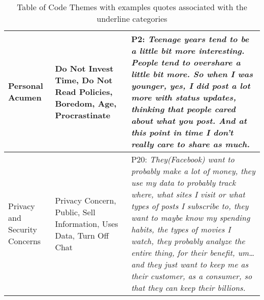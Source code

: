 \begin{table*}[htb!]
\begin{tabular}{ |p{3cm}||p{4cm}|p{10cm}| }
 \hline
 Personal Acumen    & Do Not Invest Time, Do Not Read Policies, Boredom, Age, Procrastinate& P2: \textit{Teenage years tend to be a little bit more interesting. People tend to overshare a little bit more. So when I was younger, yes, I did post a lot more with status updates, thinking that people cared about what you post. And at this point in time I don't really care to share as much. }\\
 \hline
 Privacy and Security Concerns  & Privacy Concern, Public, Sell Information, Uses Data, Turn Off Chat& P20: \textit{They(Facebook) want to probably make a lot of money, they use my data to probably track where, what sites I visit or what types of posts I subscribe to, they want to maybe know my spending habits, the types of movies I watch, they probably analyze the entire thing, for their benefit, um… and they just want to keep me as their customer, as a consumer, so that they can keep their billions.}\\ 
  \hline
 \hline
\end{tabular} 
\caption{Table of Code Themes with examples quotes associated with the underline categories}
 \label{table:coding}
\end{table*}

